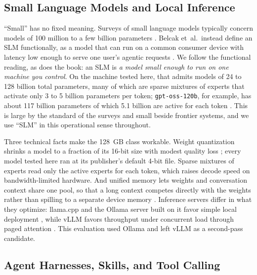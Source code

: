 \subsection{Small Language Models and Local Inference}

``Small'' has no fixed meaning. Surveys of small language models typically concern models of 100 million to a few billion parameters \cite{lu2024slm, wang2024slmsurvey}. Belcak et~al.\ instead define an SLM functionally, as a model that can run on a common consumer device with latency low enough to serve one user's agentic requests \cite{belcak2025slm}. We follow the functional reading, as does the book: an SLM is \textit{a model small enough to run on one machine you control}. On the machine tested here, that admits models of 24 to 128 billion total parameters, many of which are sparse mixtures of experts \cite{shazeer2017moe} that activate only 3 to 5 billion parameters per token; \texttt{gpt-oss-120b}, for example, has about 117 billion parameters of which 5.1 billion are active for each token \cite{openai2025gptoss}. This is large by the standard of the surveys and small beside frontier systems, and we use ``SLM'' in this operational sense throughout.

Three technical facts make the 128~GB class workable. Weight quantization shrinks a model to a fraction of its 16-bit size with modest quality loss \cite{dettmers2022llmint8, frantar2022gptq}; every model tested here ran at its publisher's default 4-bit file. Sparse mixtures of experts read only the active experts for each token, which raises decode speed on bandwidth-limited hardware. And unified memory lets weights and conversation context share one pool, so that a long context competes directly with the weights rather than spilling to a separate device memory \cite{nvidia2025dgxspark}. Inference servers differ in what they optimize: llama.cpp and the Ollama server built on it favor simple local deployment \cite{llamacpp, ollama}, while vLLM favors throughput under concurrent load through paged attention \cite{kwon2023vllm}. This evaluation used Ollama and left vLLM as a second-pass candidate.

\subsection{Agent Harnesses, Skills, and Tool Calling}

